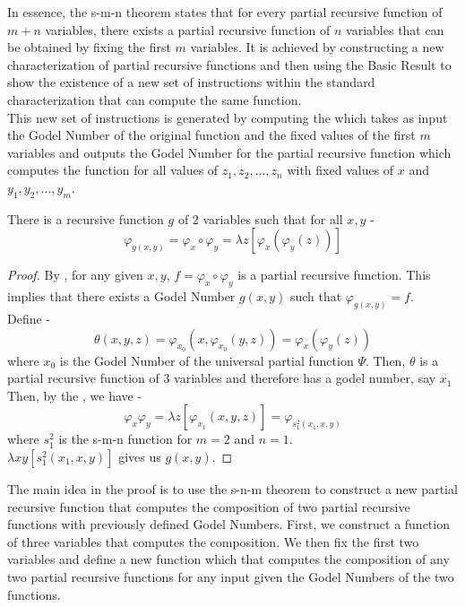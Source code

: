 \documentclass[openany]{book}
\begin{document}
\begin{mynote}
In essence, the s-m-n theorem states that for every partial recursive function of $m+n$ variables, there exists a partial recursive function of $n$ variables that can be obtained by fixing the first $m$ variables. It is achieved by constructing a new characterization of partial recursive functions and then using the Basic Result to show the existence of a new set of instructions within the standard characterization that can compute the same function.\\ 
This new set of instructions is generated by computing the  which takes as input the Godel Number of the original function and the fixed values of the first $m$ variables and outputs the Godel Number for the partial recursive function which computes the function for all values of $z_1, z_2, ..., z_n$ with fixed values of $x$ and $y_1, y_2, ..., y_m$. \\
\end{mynote}
\begin{mytheorem}
    There is a recursive function $g$ of 2 variables such that for all $x, y$ - 
    $$\varphi_{g(x, y)} = \varphi_x \circ \varphi_y = \lambda z[\varphi_x(\varphi_y(z))]$$
\end{mytheorem}
\begin{proof}
By , for any given $x, y$, $f = \varphi_x \circ \varphi_y$ is a partial recursive function. This implies that there exists a Godel Number $g(x, y)$ such that $\varphi_{g(x, y)} = f$. \\
Define - 
$$\theta(x, y, z) = \varphi_{x_0}(x, \varphi_{x_0}(y, z)) = \varphi_x(\varphi_y(z))$$
where $x_0$ is the Godel Number of the universal partial function $\Psi$. Then, $\theta$ is a partial recursive function of 3 variables and therefore has a godel number, say $x_1$ \\
Then, by the , we have -
$$\varphi_x\varphi_y=\lambda z[\varphi_{x_1}(x, y, z)] = \varphi_{s^2_1(x_1, x, y)}$$
where $s^2_1$ is the s-m-n function for $m=2$ and $n=1$. \\
$\lambda xy[s^2_1(x_1, x, y)]$ gives us $g(x, y)$. 
\end{proof}
\begin{mynote}
The main idea in the proof is to use the s-n-m theorem to construct a new partial recursive function that computes the composition of two partial recursive functions with previously defined Godel Numbers. First, we construct a function of three variables that computes the composition. We then fix the first two variables and define a new function which that computes the composition of any two partial recursive functions for any input given the Godel Numbers of the two functions. 
\end{mynote}
\end{document}
